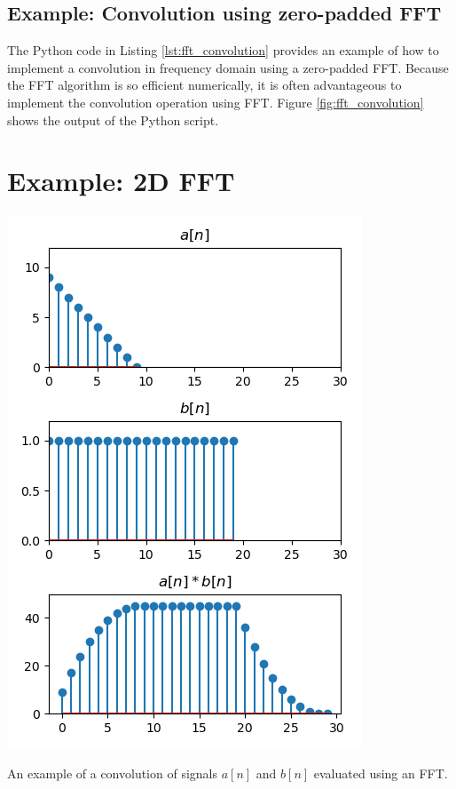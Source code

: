 \subsection{Example: Convolution using zero-padded FFT}

The Python code in Listing \ref{lst:fft_convolution} provides an
example of how to implement a convolution in frequency domain using a
zero-padded FFT. Because the FFT algorithm is so efficient
numerically, it is often advantageous to implement the convolution
operation using FFT. Figure \ref{fig:fft_convolution} shows the output
of the Python script.



\section{Example: 2D FFT}

\begin{marginfigure}
  \begin{center}
    \includegraphics[width=\textwidth]{code/021_fft_convolution/convolution.png}
  \end{center}
  \caption{An example of a convolution of signals $a[n]$ and $b[n]$ evaluated using an FFT.}
  \label{fig:fft_convolution}
\end{marginfigure}


